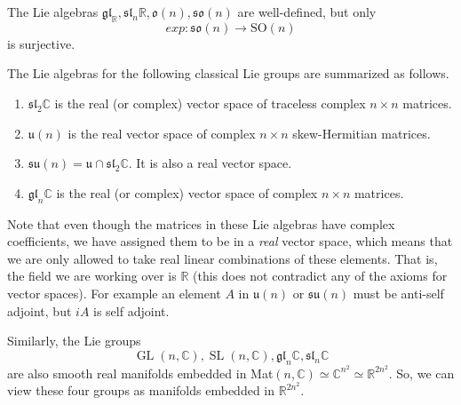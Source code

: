 \documentclass{article}
\DeclareMathOperator{\GL}{GL}
\DeclareMathOperator{\SL}{SL}
\begin{document}
      \begin{theorem}
        The Lie algebras $\mathfrak{gl}_ \mathbb{R}, \mathfrak{sl}_n \mathbb{R}, \mathfrak{o}(n), \mathfrak{so}(n)$ are well-defined, but only 
        \begin{equation}
          exp: \mathfrak{so}(n) \longrightarrow \text{SO}(n)
        \end{equation}
        is surjective. 
      \end{theorem}

      \begin{theorem}
        The Lie algebras for the following classical Lie groups are summarized as follows. 
        \begin{enumerate}
          \item $\mathfrak{sl}_2 \mathbb{C}$ is the real (or complex) vector space of traceless complex $n \times n$ matrices. 
          \item $\mathfrak{u}(n)$ is the real vector space of complex $n \times n$ skew-Hermitian matrices. 
          \item $\mathfrak{su}(n) = \mathfrak{u} \cap \mathfrak{sl}_2 \mathbb{C}$. It is also a real vector space. 
          \item $\mathfrak{gl}_n \mathbb{C}$ is the real (or complex) vector space of complex $n \times n$ matrices. 
        \end{enumerate}
        Note that even though the matrices in these Lie algebras have complex coefficients, we have assigned them to be in a \textit{real} vector space, which means that we are only allowed to take real linear combinations of these elements. That is, the field we are working over is $\mathbb{R}$ (this does not contradict any of the axioms for vector spaces). For example an element $A$ in $\mathfrak{u}(n)$ or $\mathfrak{su}(n)$ must be anti-self adjoint, but $iA$ is self adjoint. 
      \end{theorem}

      Similarly, the Lie groups 
      \begin{equation}
        \GL(n, \mathbb{C}), \SL(n, \mathbb{C}), \mathfrak{gl}_n \mathbb{C}, \mathfrak{sl}_n \mathbb{C}
      \end{equation}
      are also smooth real manifolds embedded in Mat$(n, \mathbb{C}) \simeq \mathbb{C}^{n^2} \simeq \mathbb{R}^{2 n^2}$. So, we can view these four groups as manifolds embedded in $\mathbb{R}^{2 n^2}$. 
\end{document}
